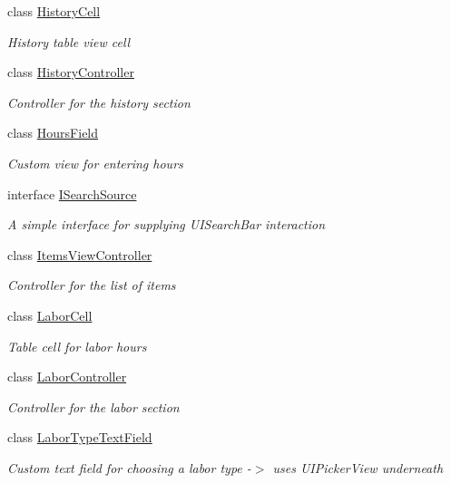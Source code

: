 \begin{DoxyCompactItemize}
class \hyperlink{class_field_service_1_1i_o_s_1_1_history_cell}{History\+Cell}
\begin{DoxyCompactList}\small\item\em History table view cell \end{DoxyCompactList}\item 
class \hyperlink{class_field_service_1_1i_o_s_1_1_history_controller}{History\+Controller}
\begin{DoxyCompactList}\small\item\em Controller for the history section \end{DoxyCompactList}\item 
class \hyperlink{class_field_service_1_1i_o_s_1_1_hours_field}{Hours\+Field}
\begin{DoxyCompactList}\small\item\em Custom view for entering hours \end{DoxyCompactList}\item 
interface \hyperlink{interface_field_service_1_1i_o_s_1_1_i_search_source}{I\+Search\+Source}
\begin{DoxyCompactList}\small\item\em A simple interface for supplying U\+I\+Search\+Bar interaction \end{DoxyCompactList}\item 
class \hyperlink{class_field_service_1_1i_o_s_1_1_items_view_controller}{Items\+View\+Controller}
\begin{DoxyCompactList}\small\item\em Controller for the list of items \end{DoxyCompactList}\item 
class \hyperlink{class_field_service_1_1i_o_s_1_1_labor_cell}{Labor\+Cell}
\begin{DoxyCompactList}\small\item\em Table cell for labor hours \end{DoxyCompactList}\item 
class \hyperlink{class_field_service_1_1i_o_s_1_1_labor_controller}{Labor\+Controller}
\begin{DoxyCompactList}\small\item\em Controller for the labor section \end{DoxyCompactList}\item 
class \hyperlink{class_field_service_1_1i_o_s_1_1_labor_type_text_field}{Labor\+Type\+Text\+Field}
\begin{DoxyCompactList}\small\item\em Custom text field for choosing a labor type -\/$>$ uses U\+I\+Picker\+View underneath \end{DoxyCompactList}\item 

\end{DoxyCompactItemize}
